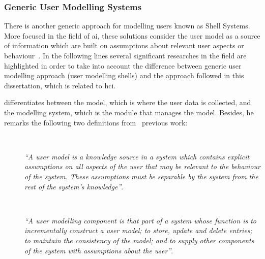 
\subsubsection{Generic User Modelling Systems}
\label{sec:generic_users}

There is another generic approach for modelling users known as Shell Systems. 
More focused in the field of \ac{ai}, these solutions consider the user model as 
a source of information which are built on assumptions about relevant user aspects 
or behaviour~\citep{pohl_logic_based_1999}. In the following lines several 
significant researches in the field are highlighted in order to take into account
the difference between generic user modelling approach (user modelling shells) and
the approach followed in this dissertation, which is related to \ac{hci}.

\citet{heckmann_ubiquitous_2005} differentiates between the model, which is where 
the user data is collected, and the modelling system, which is the module that
manages the model. Besides, he remarks the following two definitions
from~\citet{wahlster1989user} previous work:

\begin{description}
  \item[] \hfill \\
  \begin{mdframed}[hidealllines=true,backgroundcolor=gray!20]
  \textit{``A user model is a knowledge source in a system which contains explicit
  assumptions on all aspects of the user that may be relevant to the behaviour
  of the system. These assumptions must be separable by the system from the
  rest of the system's knowledge''}.
  \end{mdframed}

\newpage
  
  \item[] \hfill \\
  \begin{mdframed}[hidealllines=true,backgroundcolor=gray!20]
  \textit{``A user modelling component is that part of a system whose function is to
  incrementally construct a user model; to store, update and delete entries;
  to maintain the consistency of the model; and to supply other components of
  the system with assumptions about the user''}.
  \end{mdframed}
  
\end{description}


